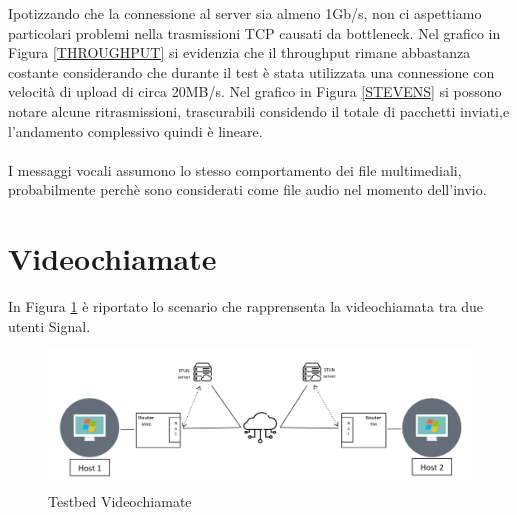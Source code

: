 \documentclass{article}
\begin{document}
  Ipotizzando che la connessione al server sia almeno 1Gb/s, non ci aspettiamo particolari problemi nella trasmissioni TCP causati da bottleneck.
  Nel grafico in Figura \ref{THROUGHPUT} si evidenzia che il throughput rimane abbastanza costante considerando che durante il test è stata utilizzata 
  una connessione con velocità di upload di circa 20MB/s. 
  Nel grafico in Figura \ref{STEVENS} si possono notare alcune ritrasmissioni, trascurabili considendo il totale di pacchetti inviati,e
  l'andamento complessivo quindi è lineare.\\\\
  
  I messaggi vocali assumono lo stesso comportamento dei file multimediali, 
  probabilmente perchè sono considerati come file audio nel momento dell'invio.

  \section{Videochiamate}

  In Figura \ref{testbed2} è riportato lo scenario che rapprensenta la videochiamata tra due utenti Signal.

  \begin{figure}
  \begin{centering}
    \includegraphics[width=1\linewidth]{testbed2.png}
    \caption{Testbed Videochiamate}\label{testbed2}
  \end{centering}
\end{figure}
\pagebreak
\end{document}
